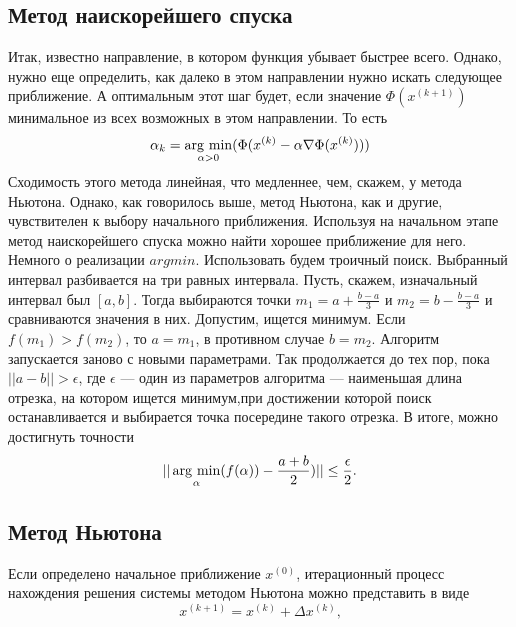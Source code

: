 \documentclass[a4paper, 12pt]{article}
\newcommand{\argmin}{\mathop{\rm arg~min}\limits}
\begin{document}
\subsection*{Метод наискорейшего спуска}
Итак, известно направление, в котором функция убывает быстрее всего. Однако, нужно
еще определить, как далеко в этом направлении нужно искать следующее приближение.
А оптимальным этот шаг будет, если значение $\Phi(x^{(k+1)})$ минимальное из всех возможных в этом направлении.
То есть 
\begin{equation}
	\alpha_k = \argmin_{\alpha > 0} (\Phi(x^{(k)} - \alpha \nabla \Phi(x^{(k)})))
\end{equation}
Сходимость этого метода линейная, что медленнее, чем, скажем, у метода Ньютона. Однако, как
говорилось выше, метод Ньютона, как и другие, чувствителен к выбору начального приближения.
Используя на начальном этапе метод наискорейшего спуска можно найти хорошее приближение для него.\\
Немного о реализации $argmin$. Использовать будем троичный поиск. Выбранный интервал разбивается на три равных интервала.
Пусть, скажем, изначальный интервал был $[a,b]$. Тогда выбираются точки $m_1 = a+\frac{b-a}{3}$ и $m_2 = b-\frac{b-a}{3}$ и сравниваются значения в них.
Допустим, ищется минимум. Если $f(m_1) > f(m_2)$, то $a = m_1$, в противном случае $b = m_2$. Алгоритм запускается заново с новыми параметрами.
Так продолжается до тех пор, пока $||a - b|| > \epsilon$, где $\epsilon$ --- один из параметров алгоритма --- наименьшая длина отрезка, на котором ищется минимум,при достижении которой поиск останавливается и выбирается точка посередине такого отрезка. В итоге, можно достигнуть точности
\begin{equation*}
	||\argmin_{\alpha}(f(\alpha)) - \frac{a+b}{2})|| \leq \frac{\epsilon}{2}.
\end{equation*}

\subsection*{Метод Ньютона}
Если определено начальное приближение $x^{(0)}$, итерационный процесс нахождения решения системы методом Ньютона можно представить в виде 
\begin{equation}
	x^{(k+1)} = x^{(k)} + \Delta x^{(k)}\text{,}
\end{equation}
\end{document}
